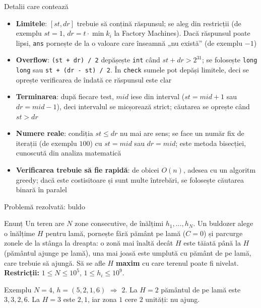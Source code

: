 \documentclass[8pt,mathserif]{beamer}
\begin{document}
\begin{frame}{Detalii care contează}
  \begin{itemize}
    \item \textbf{Limitele}: $[st, dr]$ trebuie să conțină răspunsul; se aleg din restricții (de exemplu $st = 1$, $dr = t \cdot \min k_i$ la Factory Machines). Dacă răspunsul poate lipsi, \texttt{ans} pornește de la o valoare care înseamnă „nu există” (de exemplu $-1$)
    \item \textbf{Overflow}: \texttt{(st + dr) / 2} depășește \texttt{int} când $st + dr > 2^{31}$; se folosește \texttt{long long} sau \texttt{st + (dr - st) / 2}. În \texttt{check} sumele pot depăși limitele, deci se oprește verificarea de îndată ce răspunsul este clar
    \item \textbf{Terminarea}: după fiecare test, $mid$ iese din interval ($st = mid + 1$ sau $dr = mid - 1$), deci intervalul se micșorează strict; căutarea se oprește când $st > dr$
    \item \textbf{Numere reale}: condiția $st \le dr$ nu mai are sens; se face un număr fix de iterații (de exemplu $100$) cu $st = mid$ sau $dr = mid$; este metoda bisecției, cunoscută din analiza matematică
    \item \textbf{Verificarea trebuie să fie rapidă}: de obicei $O(n)$, adesea cu un algoritm greedy; dacă este costisitoare și sunt multe întrebări, se folosește căutarea binară în paralel
  \end{itemize}
\end{frame}

\begin{frame}{Problemă rezolvată: buldo }
  \large
  \begin{exampleblock}{Enunț}
    Un teren are $N$ zone consecutive, de înălțimi $h_1, \dots, h_N$. Un buldozer alege o înălțime $H$ pentru lamă, pornește fără pământ pe lamă ($C = 0$) și parcurge zonele de la stânga la dreapta: o zonă mai înaltă decât $H$ este tăiată până la $H$ (pământul ajunge pe lamă), una mai joasă este umplută cu pământ de pe lamă, care trebuie să ajungă. Să se afle $H$ \textbf{maxim} cu care terenul poate fi nivelat. \textbf{Restricții:} $1 \le N \le 10^5$, $1 \le h_i \le 10^9$.
  \end{exampleblock}
  \begin{block}{Exemplu}
    $N = 4$, $h = (5, 2, 1, 6)$ $\Longrightarrow$ $2$. La $H = 2$ pământul de pe lamă este $3, 3, 2, 6$. La $H = 3$ este $2, 1$, iar zona $1$ cere $2$ unități: nu ajung.
  \end{block}
\end{frame}
\end{document}
